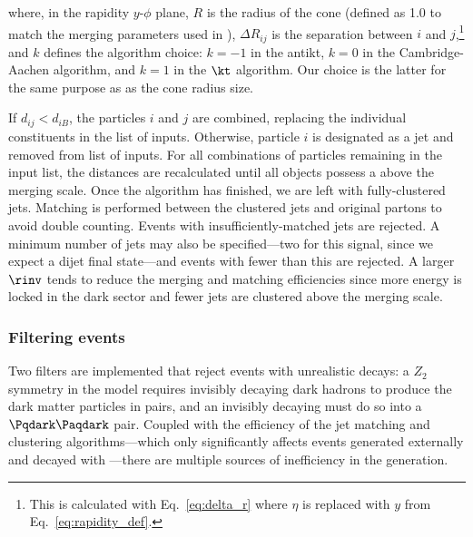 where, in the rapidity $y$-$\phi$ plane, $R$ is the radius of the cone (defined as 1.0 to match the merging parameters used in \MADGRAPH), $\Delta R_{ij}$ is the separation between $i$ and $j$,\footnote{This is calculated with Eq.~\ref{eq:delta_r} where $\eta$ is replaced with $y$ from Eq.~\ref{eq:rapidity_def}.} and $k$ defines the algorithm choice: $k = -\text{1}$ in the \gls{antikt}, $k = \text{0}$ in the Cambridge-Aachen algorithm, and $k = \text{1}$ in the $\kt$ algorithm. Our choice is the latter for the same purpose as as the cone radius size.

If $d_{ij} < d_{iB}$, the particles $i$ and $j$ are combined, replacing the individual constituents in the list of inputs. Otherwise, particle $i$ is designated as a jet and removed from list of inputs. For all combinations of particles remaining in the input list, the distances are recalculated until all objects possess a \pt above the merging scale. Once the algorithm has finished, we are left with fully-clustered \glspl{jet}. Matching is performed between the clustered jets and original partons to avoid double counting. Events with insufficiently-matched jets are rejected. A minimum number of \glspl{jet} may also be specified---two for this signal, since we expect a dijet final state---and events with fewer than this are rejected. A larger $\rinv$ tends to reduce the merging and matching efficiencies since more energy is locked in the dark sector and fewer jets are clustered above the merging scale.






\subsubsection{Filtering events}
\label{subsubsec:svj_pythia_filters}

Two filters are implemented that reject events with unrealistic decays: a $Z_2$ symmetry in the model requires invisibly decaying dark hadrons to produce the dark matter particles in pairs, and an invisibly decaying \PZprime must do so into a $\Pqdark\Paqdark$ pair. Coupled with the efficiency of the \gls{jet} matching and clustering algorithms---which only significantly affects events generated externally and decayed with \PYTHIA---there are multiple sources of inefficiency in the generation.



